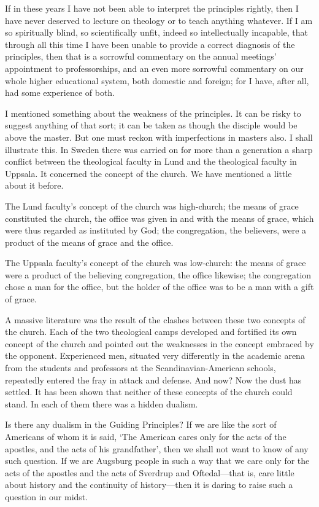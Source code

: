 If in these years I have not been able to interpret the principles rightly, then I have never deserved to lecture on theology or to teach anything whatever. If I am so spiritually blind, so scientifically unfit, indeed so intellectually incapable, that through all this time I have been unable to provide a correct diagnosis of the principles, then that is a sorrowful commentary on the annual meetings’ appointment to professorships, and an even more sorrowful commentary on our whole higher educational system, both domestic and foreign; for I have, after all, had some experience of both.

I mentioned something about the weakness of the principles. It can be risky to suggest anything of that sort; it can be taken as though the disciple would be above the master. But one must reckon with imperfections in masters also. I shall illustrate this. In Sweden there was carried on for more than a generation a sharp conflict between the theological faculty in Lund and the theological faculty in Uppsala. It concerned the concept of the church. We have mentioned a little about it before.

The Lund faculty’s concept of the church was high-church; the means of grace constituted the church, the office was given in and with the means of grace, which were thus regarded as instituted by God; the congregation, the believers, were a product of the means of grace and the office.

The Uppsala faculty’s concept of the church was low-church: the means of grace were a product of the believing congregation, the office likewise; the congregation chose a man for the office, but the holder of the office was to be a man with a gift of grace.

A massive literature was the result of the clashes between these two concepts of the church. Each of the two theological camps developed and fortified its own concept of the church and pointed out the weaknesses in the concept embraced by the opponent. Experienced men, situated very differently in the academic arena from the students and professors at the Scandinavian-American schools, repeatedly entered the fray in attack and defense. And now? Now the dust has settled. It has been shown that neither of these concepts of the church could stand. In each of them there was a hidden dualism.

Is there any dualism in the Guiding Principles? If we are like the sort of Americans of whom it is said, ‘The American cares only for the acts of the apostles, and the acts of his grandfather’, then we shall not want to know of any such question. If we are Augsburg people in such a way that we care only for the acts of the apostles and the acts of Sverdrup and Oftedal—that is, care little about history and the continuity of history—then it is daring to raise such a question in our midst.

